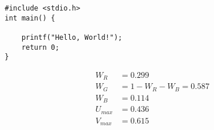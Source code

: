 \begin{lstlisting}
#include <stdio.h>
int main() {

    printf("Hello, World!");
    return 0;
}
\end{lstlisting}



\renewcommand{\sfdefault}{cmr}

\begin{equation}
  \begin{aligned}
    W_R &= 0.299 \\
    W_G &= 1 - W_R - W_B = 0.587 \\
    W_B &= 0.114 \\
    U_{max} &= 0.436 \\
    V_{max} &= 0.615
    \label{yuv_constants}
  \end{aligned}
\end{equation}


